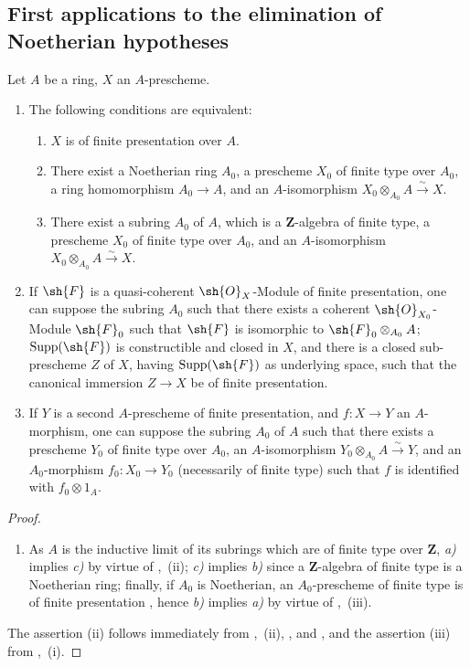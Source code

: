 \subsection{First applications to the elimination of Noetherian hypotheses}
\label{subsection:IV.8.9}

\begin{proposition}[8.9.1]
\label{IV.8.9.1}
Let $A$ be a ring, $X$ an $A$-prescheme.
\begin{enumerate}[label=(\roman*)]
\item The following conditions are equivalent:
\begin{enumerate}[label=\emph{\alph*)}]
\item $X$ is of finite presentation over $A$.
\item There exist a Noetherian ring $A_0$, a prescheme $X_0$ of finite type over $A_0$, a ring homomorphism $A_0\to A$, and an $A$-isomorphism $X_0\otimes_{A_0}A\xrightarrow{\sim}X$.
\item There exist a subring $A_0$ of $A$, which is a $\mathbf{Z}$-algebra of finite type, a prescheme $X_0$ of finite type over $A_0$, and an $A$-isomorphism $X_0\otimes_{A_0}A\xrightarrow{\sim}X$.
\end{enumerate}
\item If $\sh{F}$ is a quasi-coherent $\sh{O}_X$-Module of finite presentation, one can suppose the subring $A_0$ such that there exists a coherent $\sh{O}_{X_0}$-Module $\sh{F}_0$ such that $\sh{F}$ is isomorphic to $\sh{F}_0\otimes_{A_0}A$; $\operatorname{Supp}(\sh{F})$ is constructible and closed in $X$, and there is a closed sub-prescheme $Z$ of $X$, having $\operatorname{Supp}(\sh{F})$ as underlying space, such that the canonical immersion $Z\to X$ be of finite presentation.
\item If $Y$ is a second $A$-prescheme of finite presentation, and $f:X\to Y$ an $A$-morphism, one can suppose the subring $A_0$ of $A$ such that there exists a prescheme $Y_0$ of finite type over $A_0$, an $A$-isomorphism $Y_0\otimes_{A_0}A\xrightarrow{\sim}Y$, and an $A_0$-morphism $f_0:X_0\to Y_0$ (necessarily of finite type) such that $f$ is identified with $f_0\otimes 1_A$.
\end{enumerate}
\end{proposition}

\begin{proof}
\begin{enumerate}[label=(\roman*)]
\item As $A$ is the inductive limit of its subrings which are of finite type over $\mathbf{Z}$, \emph{a)} implies \emph{c)} by virtue of ,~(ii); \emph{c)} implies \emph{b)} since a $\mathbf{Z}$-algebra of finite type is a Noetherian ring; finally, if $A_0$ is Noetherian, an $A_0$-prescheme of finite type is of finite presentation , hence \emph{b)} implies \emph{a)} by virtue of ,~(iii).
\end{enumerate}
The assertion (ii) follows immediately from ,~(ii), , and , and the assertion (iii) from ,~(i).
\end{proof}

